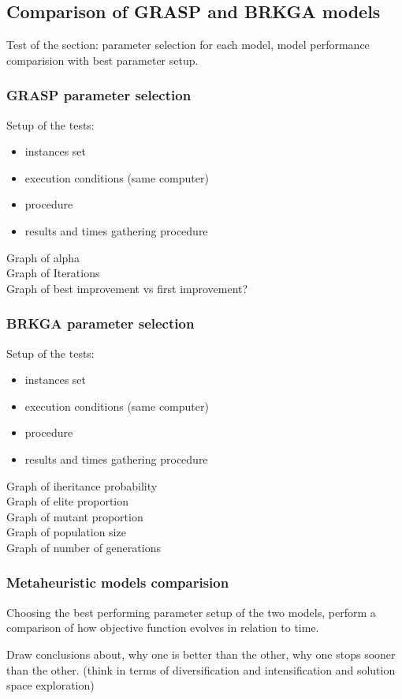 \subsection{Comparison of GRASP and BRKGA models}

Test of the section: parameter selection for each model, model performance comparision with best parameter setup.


\subsubsection{GRASP parameter selection}


Setup of the tests:\\
\begin{itemize}
	\item instances set
	\item execution conditions (same computer)
	\item procedure
	\item results and times gathering procedure
\end{itemize}


Graph of alpha\\
Graph of Iterations\\
Graph of best improvement vs first improvement?\\

\subsubsection{BRKGA parameter selection}


Setup of the tests:\\
\begin{itemize}
	\item instances set
	\item execution conditions (same computer)
	\item procedure
	\item results and times gathering procedure
\end{itemize}


Graph of iheritance probability\\
Graph of elite proportion\\
Graph of mutant proportion\\
Graph of population size\\
Graph of number of generations\\

\subsubsection{Metaheuristic models comparision}

Choosing the best performing parameter setup of the two models, perform a comparison of how objective function evolves in relation to time.

Draw conclusions about, why one is better than the other, why one stops sooner than the other. (think in terms of diversification and intensification and solution space exploration)\\

\pagebreak